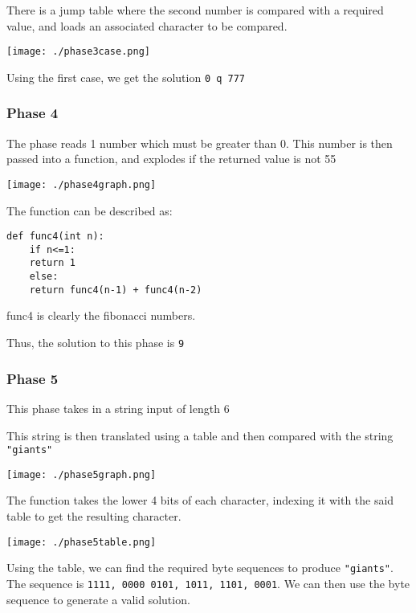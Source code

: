 \documentclass[11pt]{article}
\begin{document}
There is a jump table where the second number is compared with a required value, and loads an associated character to be compared.

\begin{center}
\texttt{[image: ./phase3case.png]}
\end{center}

Using the first case, we get the solution \texttt{0 q 777}
\subsubsection{Phase 4}
\label{sec:org00f0c3b}
The phase reads 1 number which must be greater than 0. This number is then passed into a function, and explodes if the returned value is not 55

\begin{center}
\texttt{[image: ./phase4graph.png]}
\end{center}

The function can be described as:

\begin{verbatim}
def func4(int n):
    if n<=1:
	return 1
    else:
	return func4(n-1) + func4(n-2)
\end{verbatim}

func4 is clearly the fibonacci numbers.

Thus, the solution to this phase is \texttt{9}
\subsubsection{Phase 5}
\label{sec:org490b1c2}
This phase takes in a string input of length 6

This string is then translated using a table and then compared with the string \texttt{"giants"}

\begin{center}
\texttt{[image: ./phase5graph.png]}
\end{center}

The function takes the lower 4 bits of each character, indexing it with the said table to get the resulting character.

\begin{center}
\texttt{[image: ./phase5table.png]}
\end{center}

Using the table, we can find the required byte sequences to produce \texttt{"giants"}. The sequence is \texttt{1111, 0000 0101, 1011, 1101, 0001}. We can then use the byte sequence to generate a valid solution.
\end{document}
